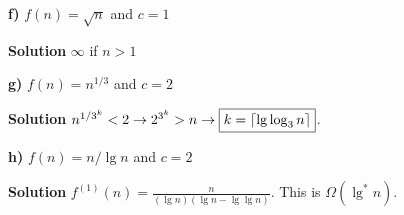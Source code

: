 \documentclass{article}
\DeclarePairedDelimiter\ceil{\lceil}{\rceil}
\begin{document}
\medskip

\textbf{f)} $f(n) = \sqrt{n}$ and $c = 1$

\medskip

\textbf{Solution} $\boxed{\infty}$ if $n > 1$

\medskip

\textbf{g)} $f(n) = n^{1/3}$ and $c = 2$

\medskip

\textbf{Solution} $n^{1/3^k} < 2 \rightarrow 2^{3^k} > n \rightarrow \boxed{k = \ceil{\lg \log_3{n}}}$.

\medskip

\textbf{h)} $f(n) = n/\lg n$ and $c = 2$

\medskip

\textbf{Solution} $f^{(1)}(n) = \frac{n}{(\lg n)(\lg n - \lg \lg n)}$. This is $\boxed{\Omega(\lg^*n)}$.

\medskip
\end{document}
